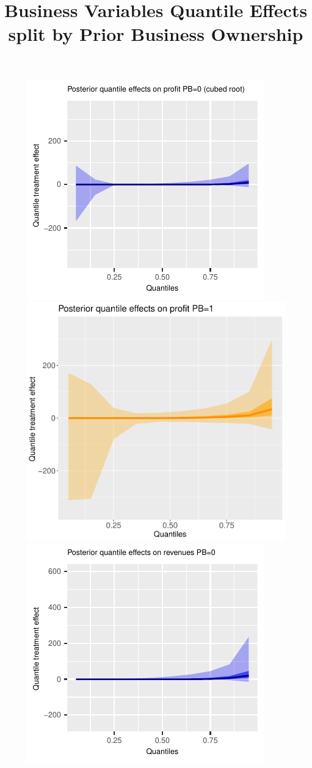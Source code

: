 \documentclass[AER]{AEA}
\begin{document}
 \begin{figure}[h!]
  \centering
    \title{Business Variables Quantile Effects split by Prior Business Ownership}
    \includegraphics{posterior_parent_quantile_TEs_profit_pb_0_lognormal.pdf}
    \includegraphics{posterior_parent_quantile_TEs_profit_pb_1_lognormal.pdf}\\
    \includegraphics{posterior_parent_quantile_TEs_revenues_pb_0_lognormal.pdf}

\end{figure}
\end{document}
